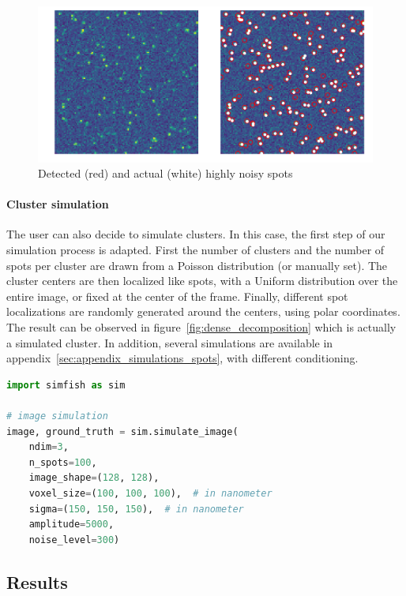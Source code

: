 \begin{figure}[h]
    \centering
    \includegraphics[width=1\textwidth]{figures/chapter2/plot_spot_detection}
    \caption{Detected (red) and actual (white) highly noisy spots}
    \label{fig:spot_detection_high_noise}
\end{figure}

\paragraph{Cluster simulation}

The user can also decide to simulate clusters.
In this case, the first step of our simulation process is adapted.
First the number of clusters and the number of spots per cluster are drawn from a Poisson distribution (or manually set).
The cluster centers are then localized like spots, with a Uniform distribution over the entire image, or fixed at the center of the frame.
Finally, different spot localizations are randomly generated around the centers, using polar coordinates.
The result can be observed in figure~\ref{fig:dense_decomposition} which is actually a simulated cluster.
In addition, several simulations are available in appendix~\ref{sec:appendix_simulations_spots}, with different conditioning.\\

\begin{minipage}{0.9\textwidth}
\begin{lstlisting}[language=Python]
import simfish as sim

# image simulation
image, ground_truth = sim.simulate_image(
	ndim=3,
	n_spots=100,
	image_shape=(128, 128),
	voxel_size=(100, 100, 100),  # in nanometer
	sigma=(150, 150, 150),  # in nanometer
	amplitude=5000,
	noise_level=300)
\end{lstlisting}
\end{minipage}

\subsection{Results} \label{subsec:detection_results}

